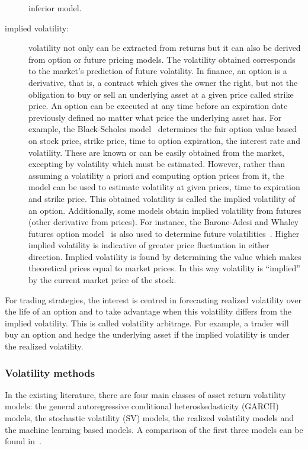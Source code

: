 \begin{description}
inferior model.   
\item[implied volatility:] volatility not only can be extracted from returns
but it can also be derived from option or future pricing models.  The
volatility obtained corresponds to the market's prediction of future
volatility. In finance, an option is a derivative, that is, a contract which
gives the owner the right, but not the obligation to buy or sell an underlying
asset at a given price called strike price. An option can be executed at any
time before an expiration date previously defined no matter what price the
underlying asset has. For example, the Black-Scholes model~\cite{black1973}
determines the fair option value based on stock price, strike price, time to
option expiration, the interest rate and volatility. These are known or can be
easily obtained from the market, excepting by volatility which must be
estimated. However, rather than assuming a volatility a priori and computing
option prices from it, the model can be used to estimate volatility at given
prices, time to expiration and strike price. This obtained volatility is called
the implied volatility of an option. Additionally, some models obtain implied
volatility from futures (other derivative from prices). For instance, the
Barone-Adesi and Whaley futures option model~\cite{baroneetal1987} is also used
to determine future volatilities~\cite{hamidetal2004}. Higher implied
volatility is indicative of greater price fluctuation in either direction.
Implied volatility is found by determining the value which makes theoretical
prices equal to market prices. In this way volatility is ``implied'' by the
current market price of the stock.
\end{description}


For trading strategies, the interest is centred in forecasting realized
volatility over the life of an option and to take advantage when this
volatility differs from the implied volatility. This is called volatility
arbitrage. For example, a trader will buy an option and hedge the underlying
asset if the implied volatility is under the realized volatility. 


\subsubsection{Volatility methods}

In the existing literature, there are four main classes of asset
return volatility models: the general autoregressive conditional
heteroskedasticity (GARCH) models, the stochastic volatility (SV)
models, the realized volatility models and the machine learning based
models. A comparison of the first three models can be found
in~\cite{wei2012}. 

